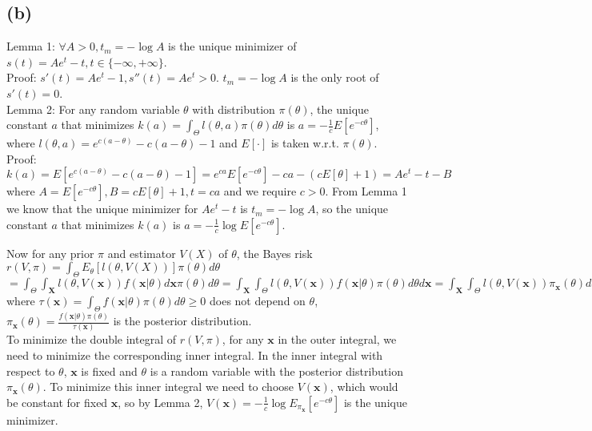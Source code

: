 \subsection*{(b)}
Lemma 1:
$
\forall A>0, t_m = -\log A
$
is the unique minimizer of
$
s(t) = Ae^t-t, t \in \{-\infty, +\infty\}
$. \\
Proof:
$s'(t) = Ae^t-1, s''(t) = Ae^t>0$.
$t_m = -\log A$ is the only root of $s'(t)=0$.
\\
Lemma 2:
For any random variable $\theta$ with distribution
$
\pi(\theta)
$,
the unique constant $a$ that minimizes
$
k(a) = \int_{\Theta} l(\theta, a) \pi(\theta)d\theta
$
is $a = -\frac{1}{c} E[e^{-c\theta}]$,
where
$
l(\theta, a) = e^{c(a-\theta)}-c(a-\theta)-1
$
and $E[\cdot]$ is taken w.r.t. $\pi(\theta)$.\\
Proof:
$
k(a) =
E[e^{c(a-\theta)}-c(a-\theta)-1] =
e^{ca}E[e^{-c\theta}]-ca - (cE[\theta]+1) =
Ae^{t}-t - B
$
\\
where
$
A=E[e^{-c\theta}],
B=cE[\theta]+1,
t=ca
$
and we require
$
c>0
$.
From Lemma 1 we know that the unique minimizer for $Ae^{t}-t$ is
$t_m=-\log A$, so the unique constant $a$ that minimizes $k(a)$ is
$a=-\frac{1}{c}\log E[e^{-c\theta}]$.

Now for any prior $\pi$ and estimator $V(X)$ of $\theta$,
the Bayes risk
$
r(V, \pi) =
\int_{\Theta} E_{\theta}[l(\theta, V(X))] \pi(\theta)d\theta
$ \\
$
= 
\int_{\Theta} \int_{\mathbf{X}} l(\theta, V(\mathbf{x})) f(\mathbf{x}|\theta) d\mathbf{x} \pi(\theta)d\theta
=
\int_{\mathbf{X}} \int_{\Theta} l(\theta, V(\mathbf{x})) f(\mathbf{x}|\theta)\pi(\theta)d\theta d\mathbf{x}
=
\int_{\mathbf{X}} \int_{\Theta} l(\theta, V(\mathbf{x})) \pi_{\mathbf{x}}(\theta)d\theta \tau(\mathbf{x})d\mathbf{x}
$ \\
where
$
\tau(\mathbf{x}) = \int_{\Theta} f(\mathbf{x} | \theta) \pi(\theta) d\theta \geq 0
$
does not depend on $\theta$,
$
\pi_{\mathbf{x}}(\theta) = \frac{f(\mathbf{x} | \theta)\pi(\theta)}{\tau(\mathbf{x})}
$
is the posterior distribution.\\
To minimize the double integral of $r(V, \pi)$, for any $\mathbf{x}$ in the outer integral, we need to minimize the corresponding inner integral.
In the inner integral with respect to $\theta$,
$\mathbf{x}$ is fixed and $\theta$ is a random variable with
the posterior distribution $\pi_{\mathbf{x}}(\theta)$.
To minimize this inner integral we need to choose $V(\mathbf{x})$, which would be constant for fixed $\mathbf{x}$, so by Lemma 2,
$V(\mathbf{x}) =
-\frac{1}{c}\log E_{\pi_{\mathbf{x}}}[e^{-c\theta}]
$ is the unique minimizer.

